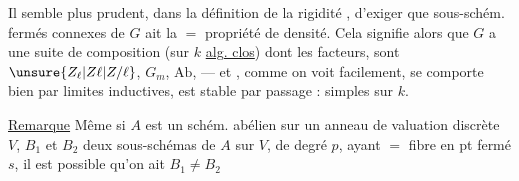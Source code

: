 Il semble plus prudent, dans la définition de
la rigidité , d'exiger que  sous-schém. fermés  connexes
de $G$ ait la $=$ propriété de densité. Cela
signifie alors que $G$ a une suite de
composition (sur $k$ \uline{alg. clos})  dont les facteurs,
sont $\unsure{Z_{\ell}|Z\ell|Z/\ell}$, $G_m$, $\mathrm{Ab}$, --- et   
, comme on voit facilement, se comporte
bien par limites inductives, est stable
par passage :    simples
sur $k$.



\uline{Remarque} Même si $A$ est un schém.
\margin{\rule[-3\baselineskip]{0.35pt}{3\baselineskip}\kern2pt\rule[-3\baselineskip]{0.35pt}{3\baselineskip}}abélien sur un anneau de valuation discrète $V$,
$B_1$ et $B_2$ deux sous-schémas  de $A$  
sur $V$, de degré $p$, ayant $=$ fibre
en  pt fermé $s$, il est possible qu'on ait $B_1\ne B_2$
